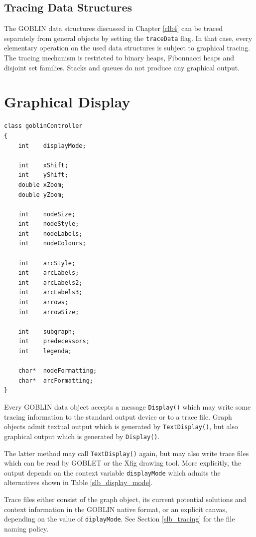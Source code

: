 \documentclass[a4paper,11pt,twoside]{book}
\begin{document}
\begin{multicols}{2}
\subsection{Tracing Data Structures}
\label{slb_trace_data}

The GOBLIN data structures discussed in Chapter \ref{clb4} can be traced
separately from general objects by setting the \verb/traceData/ flag.
In that case, every elementary operation on the used data structures is
subject to graphical tracing. The tracing mechanism is restricted to binary
heaps, Fibonnacci heaps and disjoint set families. Stacks and queues do not
produce any graphical output.



\newpage
{}
\section{Graphical Display}
\label{slb_display}
\begin{mymethods}
\begin{verbatim}
class goblinController
{
    int    displayMode;

    int    xShift;
    int    yShift;
    double xZoom;
    double yZoom;

    int    nodeSize;
    int    nodeStyle;
    int    nodeLabels;
    int    nodeColours;

    int    arcStyle;
    int    arcLabels;
    int    arcLabels2;
    int    arcLabels3;
    int    arrows;
    int    arrowSize;

    int    subgraph;
    int    predecessors;
    int    legenda;

    char*  nodeFormatting;
    char*  arcFormatting;
}
\end{verbatim}
\end{mymethods}
Every GOBLIN data object accepts a message \verb/Display()/ which may write
some tracing information to the standard output device or to a trace file.
Graph objects admit textual output which is generated by
\verb/TextDisplay()/, but also graphical output which is
generated by \verb/Display()/.

The latter method may call \verb/TextDisplay()/ again, but may
also write trace files which can be read by GOBLET or the Xfig drawing tool.
More explicitly, the output depends on the context variable \verb/displayMode/
which admits the alternatives shown in Table \ref{slb_display_mode}. 

Trace files either consist of the graph object, its current potential solutions
and context information in the GOBLIN native format, or an explicit canvas,
depending on the value of \verb/diplayMode/. See Section \ref{slb_tracing} for
the file naming policy.



\end{multicols}
\end{document}
